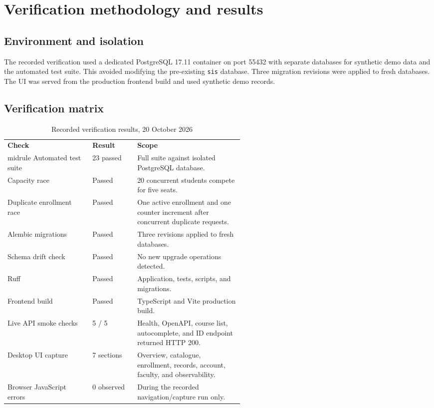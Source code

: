 \documentclass[11pt,a4paper,oneside]{report}
\begin{document}
\chapter{Verification methodology and results}
\section{Environment and isolation}
The recorded verification used a dedicated PostgreSQL 17.11 container on port 55432 with separate databases for synthetic demo data and the automated test suite. This avoided modifying the pre-existing \texttt{sis} database. Three migration revisions were applied to fresh databases. The UI was served from the production frontend build and used synthetic demo records.

\section{Verification matrix}
\begin{table}[htbp]
\centering\small
\caption{Recorded verification results, 20 October 2026}\label{tab:verification}
\begin{tabularx}{\linewidth}{@{}p{0.36\linewidth}p{0.19\linewidth}X@{}}\toprule
\textbf{Check} & \textbf{Result} & \textbf{Scope} \\midrule
Automated test suite & 23 passed & Full suite against isolated PostgreSQL database. \\
Capacity race & Passed & 20 concurrent students compete for five seats. \\
Duplicate enrollment race & Passed & One active enrollment and one counter increment after concurrent duplicate requests. \\
Alembic migrations & Passed & Three revisions applied to fresh databases. \\
Schema drift check & Passed & No new upgrade operations detected. \\
Ruff & Passed & Application, tests, scripts, and migrations. \\
Frontend build & Passed & TypeScript and Vite production build. \\
Live API smoke checks & 5 / 5 & Health, OpenAPI, course list, autocomplete, and ID endpoint returned HTTP 200. \\
Desktop UI capture & 7 sections & Overview, catalogue, enrollment, records, account, faculty, and observability. \\
Browser JavaScript errors & 0 observed & During the recorded navigation/capture run only. \\
\bottomrule\end{tabularx}
\end{table}
\end{document}
